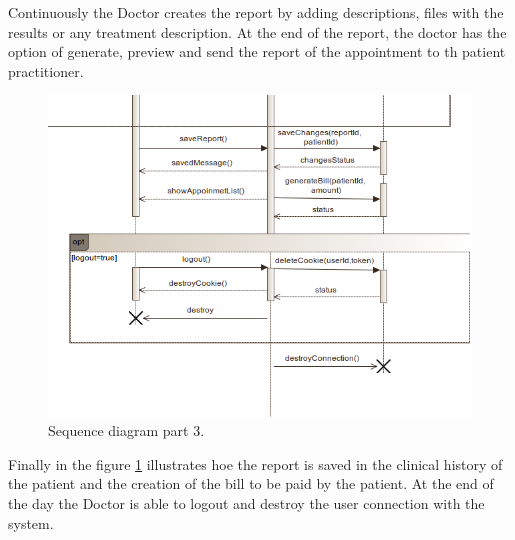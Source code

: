 \documentclass{article}
\begin{document}
{            Continuously the Doctor creates the report by adding descriptions, files with the results or any treatment description. At the end of the report, the doctor has the option of generate, preview and send the report of the appointment to
            th patient practitioner.

            \begin{figure}[H]
                \centering 
                \includegraphics[width=1\linewidth]{./img/seq3.png}
                \caption{Sequence diagram part 3.}
                \label{fig:sequence3}
            \end{figure}

            Finally in the figure \ref{fig:sequence3} illustrates hoe the report is saved in the clinical history of the patient and the creation of the bill to be paid by the patient.
            At the end of the day the Doctor is able to logout and destroy the user connection with the system.

}
\end{document}
